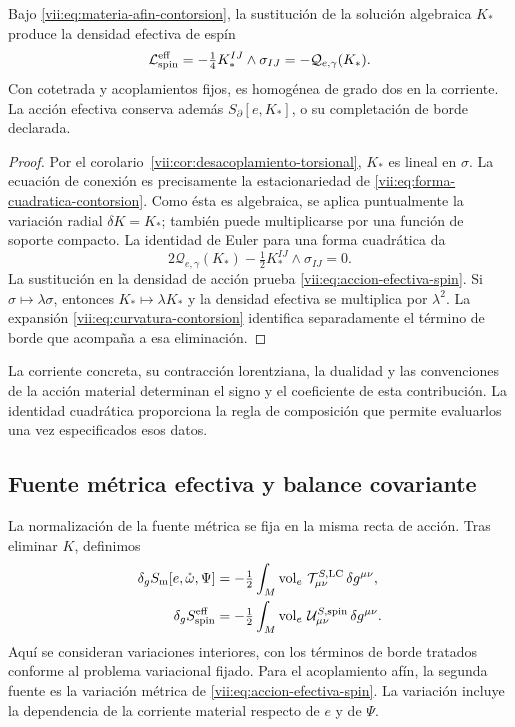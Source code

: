 \begin{theorem}
\label{vii:thm:respuesta-cuadratica}
Bajo \eqref{vii:eq:materia-afin-contorsion}, la sustitución de la
solución algebraica \(K_*\) produce la densidad efectiva de espín
\begin{equation}
 \mathcal L_{\rm spin}^{\rm eff}
 =-\tfrac14 K_*^{IJ}\wedge\sigma_{IJ}
 =-\mathcal Q_{e,\gamma}(K_*).
 \label{vii:eq:accion-efectiva-spin}
\end{equation}
Con cotetrada y acoplamientos fijos, es homogénea de grado dos en
la corriente. La acción efectiva conserva además
\(S_\partial[e,K_*]\), o su completación de borde declarada.
\end{theorem}
\begin{proof}
Por el corolario~\ref{vii:cor:desacoplamiento-torsional},
\(K_*\) es lineal en \(\sigma\). La ecuación de conexión es
precisamente la estacionariedad de
\eqref{vii:eq:forma-cuadratica-contorsion}. Como ésta es algebraica,
se aplica puntualmente la variación radial \(\delta K=K_*\);
también puede multiplicarse por una función de soporte compacto.
La identidad de Euler para una forma cuadrática da
\[
 2\mathcal Q_{e,\gamma}(K_*)
             -\tfrac12K_*^{IJ}\wedge\sigma_{IJ}=0.
\]
La sustitución en la densidad de acción prueba
\eqref{vii:eq:accion-efectiva-spin}. Si
\(\sigma\mapsto\lambda\sigma\), entonces
\(K_*\mapsto\lambda K_*\) y la densidad efectiva se multiplica
por \(\lambda^2\). La expansión
\eqref{vii:eq:curvatura-contorsion} identifica separadamente el
término de borde que acompaña a esa eliminación.
\end{proof}

La corriente concreta, su contracción lorentziana, la dualidad y las
convenciones de la acción material determinan el signo y el coeficiente
de esta contribución. La identidad cuadrática proporciona la regla de
composición que permite evaluarlos una vez especificados esos datos.

\subsection{Fuente métrica efectiva y balance covariante}
\label{vii:subsec:fuente-metrica-efectiva}

La normalización de la fuente métrica se fija en la misma recta de
acción. Tras eliminar \(K\), definimos
\begin{align}
 \delta_g S_{\rm m}[e,\mathring\omega,\Psi]
 &=-\tfrac12\int_M\operatorname{vol}_e\,
                   \mathcal T^{S,\rm LC}_{\mu\nu}\,\delta g^{\mu\nu},
 \\
 \delta_g S_{\rm spin}^{\rm eff}
 &=-\tfrac12\int_M\operatorname{vol}_e\,
                   \mathcal U^{S,\rm spin}_{\mu\nu}\,\delta g^{\mu\nu}.
 \label{vii:eq:fuentes-normalizadas-accion}
\end{align}
Aquí se consideran variaciones interiores, con los términos de borde
tratados conforme al problema variacional fijado. Para el acoplamiento
afín, la segunda fuente es la variación métrica de
\eqref{vii:eq:accion-efectiva-spin}. La variación incluye la dependencia
de la corriente material respecto de \(e\) y de \(\Psi\).

